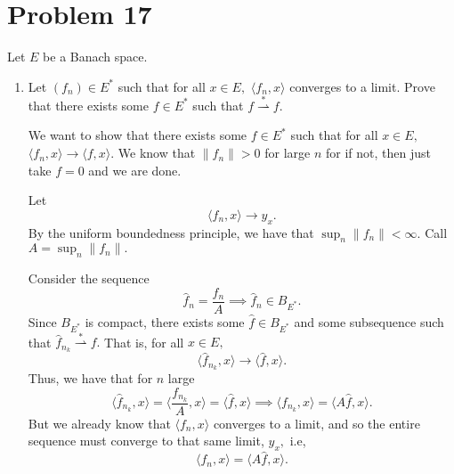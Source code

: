 \documentclass[11pt]{article}
\begin{document}
\newpage
\section*{Problem 17}
\begin{problem}
    Let $E$ be a Banach space.
    \begin{enumerate}
        \item Let $(f_n) \in E^*$ such that for all $x\in E,$ $\langle f_n, x \rangle$ converges to a limit. Prove that there exists some $f\in E^*$ such that $f\stackrel{\ast}{\rightharpoonup} f.$
    \begin{solution}
        We want to show that there exists some $f \in E^*$ such that for all $x\in E,$ $\langle f_n, x \rangle \to \langle f, x\rangle.$ We know that $\|f_n\| >0$ for large $n$ for if not, then just take $f = 0$ and we are done.
        
        Let 
        \[\langle f_n, x\rangle \to y_x.\] By the uniform boundedness principle, we have that $\sup_{n}\|f_n\|< \infty.$ Call $A = \sup_{n}\|f_n\|.$
        
        Consider the sequence 
        \[\hat{f}_n = 
            \frac{f_n}{A} \implies \hat{f}_n \in B_{E^*}.\] Since $B_{E^*}$ is compact, there exists some $\hat{f}\in B_{E^*}$ and some subsequence such that $\hat{f}_{n_k} \stackrel{\ast}{\rightharpoonup} f.$ That is, for all $x\in E,$ 
        \[\langle \hat{f}_{n_k}, x\rangle \to \langle \hat{f}, x\rangle.\] 
        Thus, we have that for $n$ large
        \[\langle \hat{f}_{n_k}, x\rangle = \langle \frac{f_{n_k}}{A}, x\rangle = \langle \hat{f}, x\rangle \implies \langle f_{n_k}, x \rangle = \langle A\hat{f}, x\rangle.\] But we already know that $\langle f_n , x\rangle$ converges to a limit, and so the entire sequence must converge to that same limit, $y_x,$ i.e,
        \[\langle f_{n}, x \rangle = \langle A\hat{f}, x\rangle.\]
        

\end{solution}
\end{enumerate}
\end{problem}
\end{document}

